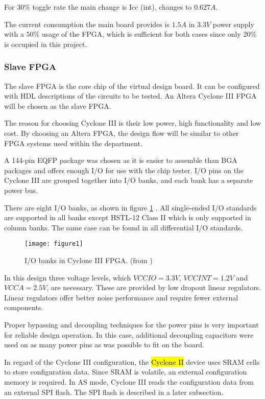 For $30\%$ toggle rate the main change is Icc (int), changes to $0.627A$.

The current consumption the main board provides is $1.5A$ in $3.3V$ power supply
with a $50\%$ usage of the FPGA, which is sufficient for both cases since only $20\%$
is occupied in this project.


\subsubsection{Slave FPGA}
The slave FPGA is the core chip of the virtual design board. It can be configured
with HDL descriptions of the circuits to be tested.
An Altera Cyclone III FPGA will be chosen as the slave FPGA.

The reason for choosing Cyclone III is their low power, high functionality and low cost. By choosing
an Altera FPGA, the design flow will be similar to other FPGA systems used within the department.

A 144-pin EQFP package was chosen as it is easier to assemble than BGA packages and offers enough I/O
for use with the chip tester. I/O pins on the Cyclone III are grouped together into I/O banks,
and each bank has a separate power bus.

There are eight I/O banks, as shown in figure \ref{fig:b2_f1} \citep{Altera:2011:cyclone3handbook}.
All single-ended I/O standards are supported in all banks except HSTL-12 Class II which is only supported in column banks.
The same case can be found in all differential I/O standards.

\begin{figure}
 \centering
 \texttt{[image: figure1]}
 \caption{I/O banks in Cyclone III FPGA. (from \citep{Altera:2011:cyclone3handbook})}
 \label{fig:b2_f1}
\end{figure}

In this design three voltage levels, which $VCCIO=3.3V$, $VCCINT= 1.2V$ and $VCCA=2.5V$, are necessary. These are provided
by low dropout linear regulators. Linear regulators offer better noise performance and require fewer external components.

Proper bypassing and decoupling techniques for the power pins is very important for reliable design operation.
In this case, additional decoupling capacitors were used on as many power pins as was possible to fit on the board.

In regard of the Cyclone III configuration, the \hl{Cyclone II} device uses SRAM cells to
store configuration data. Since SRAM is volatile, an external configuration memory is required.
In AS mode, Cyclone III reads the configuration data from an external SPI flash. The SPI
flash is described in a later subsection.

